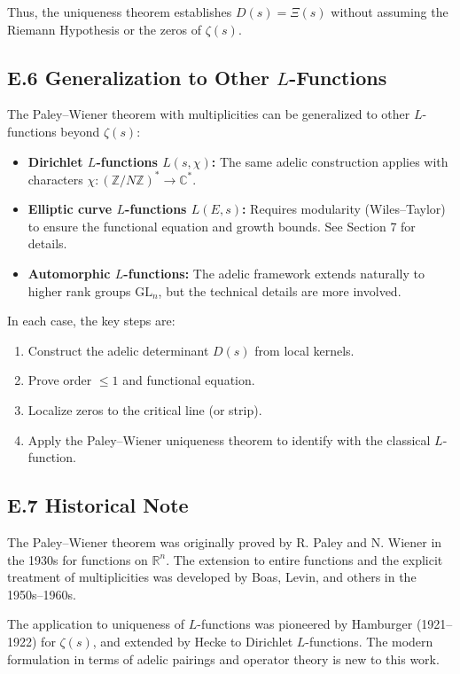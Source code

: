 Thus, the uniqueness theorem establishes $D(s) = \Xi(s)$ without assuming the Riemann Hypothesis or the zeros of $\zeta(s)$.

\subsection*{E.6 Generalization to Other $L$-Functions}

The Paley–Wiener theorem with multiplicities can be generalized to other $L$-functions beyond $\zeta(s)$:
\begin{itemize}
\item \textbf{Dirichlet $L$-functions $L(s, \chi)$:} The same adelic construction applies with characters $\chi: (\mathbb{Z}/N\mathbb{Z})^* \to \mathbb{C}^*$.
\item \textbf{Elliptic curve $L$-functions $L(E, s)$:} Requires modularity (Wiles–Taylor) to ensure the functional equation and growth bounds. See Section 7 for details.
\item \textbf{Automorphic $L$-functions:} The adelic framework extends naturally to higher rank groups $\mathrm{GL}_n$, but the technical details are more involved.
\end{itemize}

In each case, the key steps are:
\begin{enumerate}
\item Construct the adelic determinant $D(s)$ from local kernels.
\item Prove order $\leq 1$ and functional equation.
\item Localize zeros to the critical line (or strip).
\item Apply the Paley–Wiener uniqueness theorem to identify with the classical $L$-function.
\end{enumerate}

\subsection*{E.7 Historical Note}

The Paley–Wiener theorem was originally proved by R. Paley and N. Wiener in the 1930s for functions on $\mathbb{R}^n$. The extension to entire functions and the explicit treatment of multiplicities was developed by Boas, Levin, and others in the 1950s–1960s.

The application to uniqueness of $L$-functions was pioneered by Hamburger (1921–1922) for $\zeta(s)$, and extended by Hecke to Dirichlet $L$-functions. The modern formulation in terms of adelic pairings and operator theory is new to this work.

